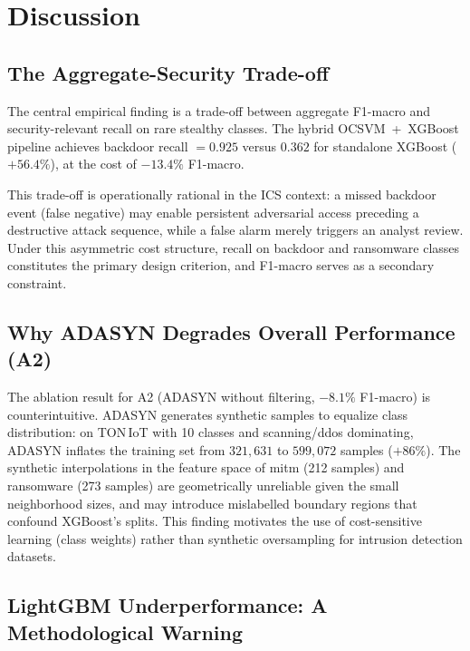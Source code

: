 \section{Discussion}
\label{sec:discussion}

\subsection{The Aggregate-Security Trade-off}
\label{sec:discussion_tradeoff}

The central empirical finding is a trade-off between aggregate F1-macro and
security-relevant recall on rare stealthy classes. The hybrid OCSVM~+~XGBoost
pipeline achieves backdoor recall $= 0.925$ versus $0.362$ for standalone
XGBoost ($+56.4\%$), at the cost of $-13.4\%$ F1-macro.

This trade-off is operationally rational in the ICS context: a missed backdoor
event (false negative) may enable persistent adversarial access preceding a
destructive attack sequence, while a false alarm merely triggers an analyst
review. Under this asymmetric cost structure, recall on backdoor and ransomware
classes constitutes the primary design criterion, and F1-macro serves as a
secondary constraint.

\subsection{Why ADASYN Degrades Overall Performance (A2)}
\label{sec:discussion_adasyn}

The ablation result for A2 (ADASYN without filtering, $-8.1\%$ F1-macro) is
counterintuitive. ADASYN generates synthetic samples to equalize class
distribution: on TON\,IoT with 10 classes and scanning/ddos dominating,
ADASYN inflates the training set from $321{,}631$ to $599{,}072$ samples
($+86\%$). The synthetic interpolations in the feature space of mitm
(212 samples) and ransomware (273 samples) are geometrically unreliable
given the small neighborhood sizes, and may introduce mislabelled boundary
regions that confound XGBoost's splits. This finding motivates the use of
cost-sensitive learning (class weights) rather than synthetic oversampling
for intrusion detection datasets.

\subsection{LightGBM Underperformance: A Methodological Warning}
\label{sec:discussion_lgb}

